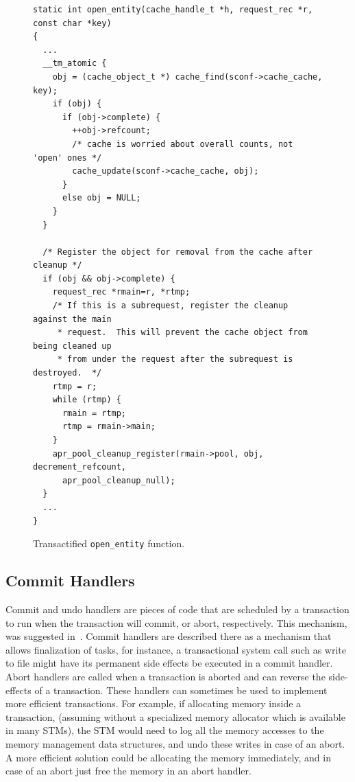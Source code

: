 \documentclass[preprint,11pt]{sigplanconf}
\let \cite = \citep
\begin{document}
\begin{figure}
\begin{lstlisting}
static int open_entity(cache_handle_t *h, request_rec *r, const char *key)
{
  ...
  __tm_atomic {
    obj = (cache_object_t *) cache_find(sconf->cache_cache, key);
    if (obj) {
      if (obj->complete) {
        ++obj->refcount;
        /* cache is worried about overall counts, not 'open' ones */
        cache_update(sconf->cache_cache, obj);
      }
      else obj = NULL;
    }
  }

  /* Register the object for removal from the cache after cleanup */
  if (obj && obj->complete) {
    request_rec *rmain=r, *rtmp;
    /* If this is a subrequest, register the cleanup against the main
     * request.  This will prevent the cache object from being cleaned up
     * from under the request after the subrequest is destroyed.  */
    rtmp = r;
    while (rtmp) {
      rmain = rtmp;
      rtmp = rmain->main;
    }
    apr_pool_cleanup_register(rmain->pool, obj, decrement_refcount, 
      apr_pool_cleanup_null);
  }
  ...
}
\end{lstlisting}
\caption{Transactified {\tt open\_entity} function.}
\label{code:transactified-open-entity}
\end{figure}

\subsection{Commit Handlers}
Commit and undo handlers are pieces of code that are scheduled by a transaction
to run when the transaction will commit, or abort, respectively. This mechanism,
was suggested in~\cite{tm:commit-handlers}.  Commit handlers are described
there as a mechanism that allows finalization of tasks, for instance, a
transactional system call such as write to file might have its permanent side
effects be executed in a commit handler. 
Abort handlers are called when a transaction is aborted and can reverse the 
side-effects of a transaction. These handlers can sometimes be used to implement
more efficient transactions. For example, if allocating memory inside a
transaction, (assuming without a specialized memory allocator which is available
in many STMs), the STM would need to log all the memory accesses to the memory
management data structures, and undo these writes in case of an abort. A more
efficient solution could be allocating the memory immediately, and in case of an
abort just free the memory in an abort handler.
\end{document}
